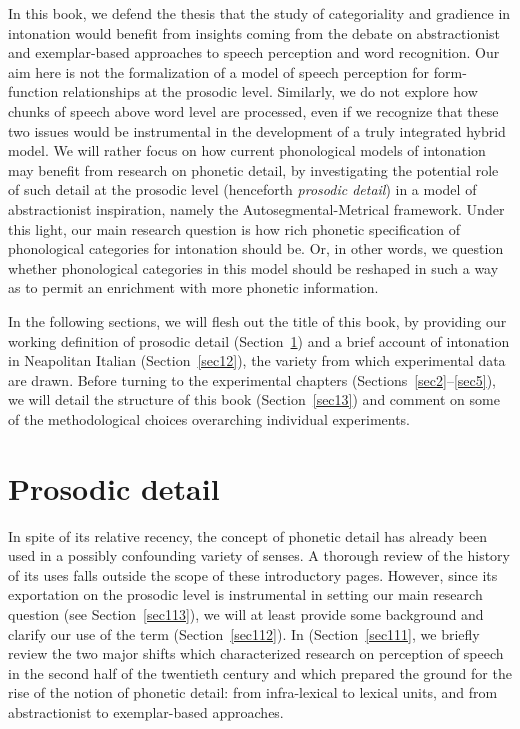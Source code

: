 In this book, we defend the thesis that the study of categoriality and gradience in intonation would benefit from insights coming from the debate on abstractionist and exemplar-based approaches to speech perception and word recognition. Our aim here is not the formalization of a model of speech perception for form-function relationships at the prosodic level. Similarly, we do not explore how chunks of speech above word level are processed, even if we recognize that these two issues would be instrumental in the development of a truly integrated hybrid model. We will rather focus on how current phonological models of intonation may benefit from research on phonetic detail, by investigating the potential role of such detail at the prosodic level (henceforth \textit{prosodic detail}) in a model of abstractionist inspiration, namely the Autosegmental-Metrical framework. Under this light, our main research question is how rich phonetic specification of phonological categories for intonation should be. Or, in other words, we question whether phonological categories in this model should be reshaped in such a way as to permit an enrichment with more phonetic information.

In the following sections, we will flesh out the title of this book, by providing our working definition of prosodic detail (Section~\ref{sec11}) and a brief account of intonation in Neapolitan Italian (Section~\ref{sec12}), the variety from which experimental data are drawn. Before turning to the experimental chapters (Sections~\ref{sec2}--\ref{sec5}), we will detail the structure of this book (Section~\ref{sec13}) and comment on some of the methodological choices overarching individual experiments.

\section{Prosodic detail}\label{sec11}
In spite of its relative recency, the concept of phonetic detail has already been used in a possibly confounding variety of senses. A thorough review of the history of its uses falls outside the scope of these introductory pages. However, since its exportation on the prosodic level is instrumental in setting our main research question (see Section~\ref{sec113}), we will at least provide some background and clarify our use of the term (Section~\ref{sec112}). In (Section~\ref{sec111}, we briefly review the two major shifts which characterized research on perception of speech in the second half of the twentieth century and which prepared the ground for the rise of the notion of phonetic detail: from infra-lexical to lexical units, and from abstractionist to exemplar-based approaches.

